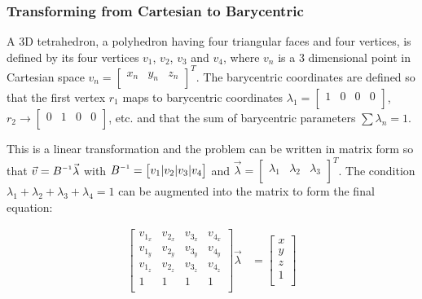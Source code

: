 \subsubsection{Transforming from Cartesian to Barycentric}

A 3D tetrahedron,  a  polyhedron having four triangular faces and four vertices,
is defined  by its four vertices $v_1$, $v_2$, $v_3$ and $v_4$, where $v_n$ is a
3 dimensional point in Cartesian space $v_n = \begin{bmatrix} x_n & y_n & z_n \\
\end{bmatrix}^T$.  The  barycentric  coordinates  are defined so that the  first
vertex $r_1$ maps to barycentric coordinates $\lambda_1 = \begin{bmatrix} 1  & 0
&  0 & 0 \\ \end{bmatrix}$,  $r_2  \to  \begin{bmatrix}  0  &  1  &  0  &  0  \\
\end{bmatrix}$, etc. and that the sum of barycentric parameters $\sum\lambda_n
= 1$.

This is a linear transformation and the problem can be written in matrix form so
that $\vec{v} = B \inverse \vec{\lambda}$ with $B \inverse = \begin{bmatrix} v_1
|  v_2  |  v_3  |  v_4  \\  \end{bmatrix}$  and $\vec{\lambda} = \begin{bmatrix}
\lambda_1 &  \lambda_2 & \lambda_3 \\ \end{bmatrix}^T$. The condition $\lambda_1
+  \lambda_2  +  \lambda_3 + \lambda_4 = 1$ can be augmented into the matrix  to
form the final equation:

\begin{align*}
    \begin{bmatrix}
        v_{1_x} & v_{2_x} & v_{3_x} & v_{4_x} \\
        v_{1_y} & v_{2_y} & v_{3_y} & v_{4_y} \\
        v_{1_z} & v_{2_z} & v_{3_z} & v_{4_z} \\
        1 & 1 & 1 & 1 \\
    \end{bmatrix}
    \vec{\lambda} &= \begin{bmatrix}
        x \\
        y \\
        z \\
        1 \\
    \end{bmatrix} \\
\end{align*}

